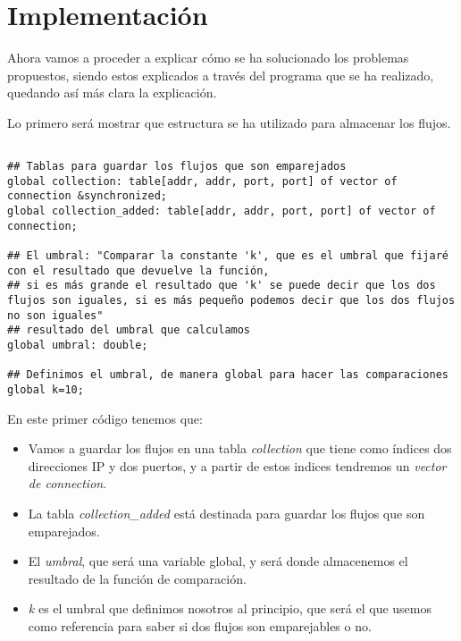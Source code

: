 \chapter{Implementación}

Ahora vamos a proceder a explicar cómo se ha solucionado los problemas 
propuestos, siendo estos explicados a través del programa que se ha 
realizado, quedando así más clara la explicación.
\intro

Lo primero será mostrar que estructura se ha utilizado para almacenar los 
flujos.
\intro
\begin{lstlisting}[style=CodigoC]

## Tablas para guardar los flujos que son emparejados
global collection: table[addr, addr, port, port] of vector of connection &synchronized;
global collection_added: table[addr, addr, port, port] of vector of connection;

## El umbral: "Comparar la constante 'k', que es el umbral que fijaré con el resultado que devuelve la función,
## si es más grande el resultado que 'k' se puede decir que los dos flujos son iguales, si es más pequeño podemos decir que los dos flujos no son iguales"
## resultado del umbral que calculamos
global umbral: double;

## Definimos el umbral, de manera global para hacer las comparaciones
global k=10;

\end{lstlisting}

En este primer código tenemos que: 
\begin{itemize}
\item Vamos a guardar los flujos en una tabla \textit{collection} que tiene como índices 
dos direcciones IP y dos puertos, y a partir de estos indices tendremos un \textit{vector de connection}.
\item La tabla \textit{collection_added} está destinada para guardar los flujos que son 
emparejados.
\item El \textit{umbral}, que será una variable global, y será donde almacenemos el resultado 
de la función de comparación.
\item \textit{k} es el umbral que definimos nosotros al principio, que será el que usemos como 
referencia para saber si dos flujos son emparejables o no.
\end{itemize}

